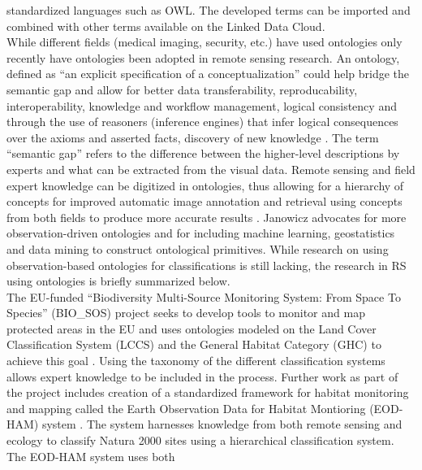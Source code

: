 \documentclass[authoryear, review,12pt,number]{elsarticle}
\begin{document}
standardized languages such as OWL. The developed terms can be imported and
combined with other terms available on the Linked Data Cloud. 
\\
While different fields (medical imaging, security,
etc.) have used ontologies only recently have ontologies been adopted in remote
sensing research. An ontology, defined  as ``an explicit specification of a
conceptualization'' \citep{gruber1993} could help bridge the semantic gap and
allow for better data transferability, reproducability, interoperability,
knowledge and workflow management, logical consistency and through the use of
reasoners (inference engines) that infer logical consequences over the axioms
and asserted facts, discovery of new knowledge \citep{Arvor2013, Andres2013a}.
The term ``semantic gap'' refers to the difference between the higher-level
descriptions by experts and what can be extracted from the visual data. Remote
sensing and field expert knowledge can be digitized in ontologies, thus
allowing for a hierarchy of concepts for improved automatic image annotation
and retrieval using concepts from both fields to produce more accurate results
\cite{Srikanth:2005:EOA:1076034.1076128}. Janowicz \cite{Janowicz2012}
advocates for more observation-driven ontologies and for including machine
learning, geostatistics and data mining to construct ontological primitives.
While research on using observation-based ontologies for classifications is
still lacking, the research in RS using ontologies is briefly summarized below.
\\
The EU-funded  ``Biodiversity Multi-Source Monitoring System: From Space To
Species'' (BIO\_SOS) project seeks to develop tools to monitor and map protected
areas in the EU and uses ontologies modeled on the Land Cover Classification
System (LCCS) and the General Habitat Category (GHC) to achieve this goal
\citep{Arvor2013}.  Using the taxonomy of the different classification systems
allows expert knowledge to be included in the process. Further work as part of
the project includes creation of a standardized
framework for habitat monitoring and mapping called the Earth Observation Data
for Habitat Montioring (EOD-HAM) system \citep{Lucas2015}. The system harnesses
knowledge from both remote sensing and ecology to classify Natura 2000 sites
using a hierarchical classification system. The EOD-HAM system uses both
\end{document}
